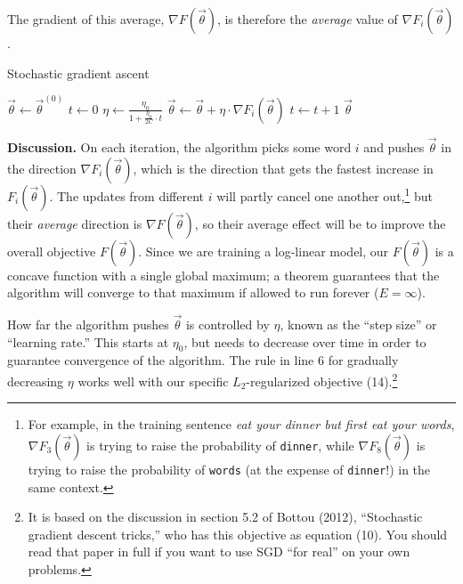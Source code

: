 The gradient of this average, $\nabla F(\vec{\theta})$, is therefore the \emph{average} value of $\nabla F_i(\vec{\theta})$.

\begin{algorithm}[H]
\caption{Stochastic gradient ascent}
\begin{algorithmic}[1]
\State $\vec{\theta} \gets \vec{\theta}^{(0)}$
\State $t \gets 0$ 
 
     
        \State $\eta \gets \frac{\eta_0}{1 + \frac{\eta_0}{2C} \cdot t}$ 
        \State $\vec{\theta} \gets \vec{\theta} + \eta \cdot \nabla F_i(\vec{\theta})$ 
        \State $t \gets t+1$
    \EndFor
\EndFor
\State \Return $\vec{\theta}$
\EndProcedure
\end{algorithmic}
\end{algorithm}

\noindent \textbf{Discussion.} On each iteration, the algorithm picks some word $i$ and pushes $\vec{\theta}$ in the direction $\nabla F_i(\vec{\theta})$, which is the direction that gets the fastest increase in $F_i(\vec{\theta})$. The updates from different $i$ will partly cancel one another out,\footnote{For example, in the training sentence \textit{eat your dinner but first eat your words}, $\nabla F_3(\vec{\theta})$ is trying to raise the probability of \texttt{dinner}, while $\nabla F_8(\vec{\theta})$ is trying to raise the probability of \texttt{words} (at the expense of \texttt{dinner}!) in the same context.} but their \emph{average} direction is $\nabla F(\vec{\theta})$, so their average effect will be to improve the overall objective $F(\vec{\theta})$. Since we are training a log-linear model, our $F(\vec{\theta})$ is a concave function with a single global maximum; a theorem guarantees that the algorithm will converge to that maximum if allowed to run forever ($E = \infty$).  

How far the algorithm pushes $\vec{\theta}$ is controlled by $\eta$, known as the “step size” or “learning rate.” This starts at $\eta_0$, but needs to decrease over time in order to guarantee convergence of the algorithm. The rule in line 6 for gradually decreasing $\eta$ works well with our specific $L_2$-regularized objective (14).\footnote{It is based on the discussion in section 5.2 of Bottou (2012), ``Stochastic gradient descent tricks,'' who has this objective as equation (10). You should read that paper in full if you want to use SGD ``for real'' on your own problems.}

